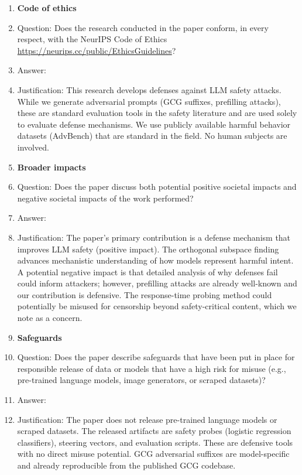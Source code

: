 \begin{enumerate}
\item {\bf Code of ethics}
    \item[] Question: Does the research conducted in the paper conform, in every respect, with the NeurIPS Code of Ethics \url{https://neurips.cc/public/EthicsGuidelines}?
    \item[] Answer: \answerYes{}
    \item[] Justification: This research develops defenses against LLM safety attacks. While we generate adversarial prompts (GCG suffixes, prefilling attacks), these are standard evaluation tools in the safety literature and are used solely to evaluate defense mechanisms. We use publicly available harmful behavior datasets (AdvBench) that are standard in the field. No human subjects are involved.

\item {\bf Broader impacts}
    \item[] Question: Does the paper discuss both potential positive societal impacts and negative societal impacts of the work performed?
    \item[] Answer: \answerYes{}
    \item[] Justification: The paper's primary contribution is a defense mechanism that improves LLM safety (positive impact). The orthogonal subspace finding advances mechanistic understanding of how models represent harmful intent. A potential negative impact is that detailed analysis of why defenses fail could inform attackers; however, prefilling attacks are already well-known and our contribution is defensive. The response-time probing method could potentially be misused for censorship beyond safety-critical content, which we note as a concern.

\item {\bf Safeguards}
    \item[] Question: Does the paper describe safeguards that have been put in place for responsible release of data or models that have a high risk for misuse (e.g., pre-trained language models, image generators, or scraped datasets)?
    \item[] Answer: \answerNA{}
    \item[] Justification: The paper does not release pre-trained language models or scraped datasets. The released artifacts are safety probes (logistic regression classifiers), steering vectors, and evaluation scripts. These are defensive tools with no direct misuse potential. GCG adversarial suffixes are model-specific and already reproducible from the published GCG codebase.


\end{enumerate}

